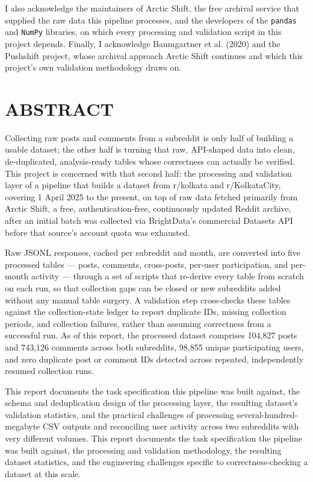 \documentclass[12pt]{article}
\begin{document}
I also acknowledge the maintainers of Arctic Shift, the free archival service that supplied the
raw data this pipeline processes, and the developers of the \texttt{pandas} and \texttt{NumPy}
libraries, on which every processing and validation script in this project depends. Finally, I
acknowledge Baumgartner et al. (2020) and the Pushshift project, whose archival approach Arctic
Shift continues and which this project's own validation methodology draws on.

\section*{ABSTRACT}

Collecting raw posts and comments from a subreddit is only half of building a usable dataset; the
other half is turning that raw, API-shaped data into clean, de-duplicated, analysis-ready tables
whose correctness can actually be verified. This project is concerned with that second half: the
processing and validation layer of a pipeline that builds a dataset from r/kolkata and
r/KolkataCity, covering 1 April 2025 to the present, on top of raw data fetched primarily from
Arctic Shift, a free, authentication-free, continuously updated Reddit archive, after an initial
batch was collected via BrightData's commercial Datasets API before that source's account quota
was exhausted.

Raw JSONL responses, cached per subreddit and month, are converted into five processed tables —
posts, comments, cross-posts, per-user participation, and per-month activity — through a set of
scripts that re-derive every table from scratch on each run, so that collection gaps can be closed
or new subreddits added without any manual table surgery. A validation step cross-checks these
tables against the collection-state ledger to report duplicate IDs, missing collection periods,
and collection failures, rather than assuming correctness from a successful run. As of this
report, the processed dataset comprises 104,827 posts and 743,126 comments across both
subreddits, 98,855 unique participating users, and zero duplicate post or comment IDs detected
across repeated, independently resumed collection runs.

This report documents the task specification this pipeline was built against, the schema and
deduplication design of the processing layer, the resulting dataset's validation statistics, and
the practical challenges of processing several-hundred-megabyte CSV outputs and reconciling user
activity across two subreddits with very different volumes. This report documents the task
specification the pipeline was built against, the processing and validation methodology, the
resulting dataset statistics, and the engineering challenges specific to correctness-checking a
dataset at this scale.
\end{document}
